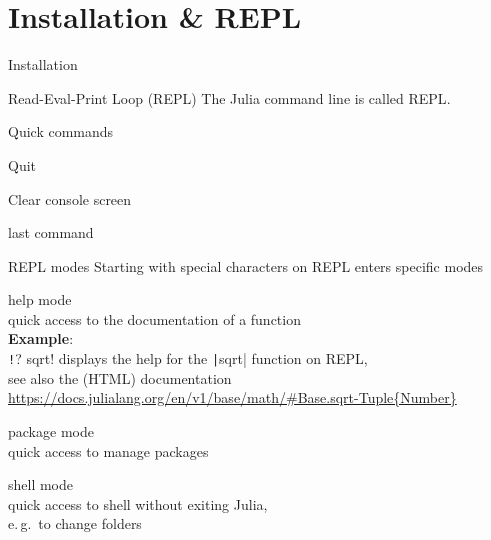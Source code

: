 \documentclass[aspectratio=169, handout]{beamer}
\begin{document}
    \section{Installation \& REPL}
    \begin{frame}{Installation}
    \end{frame}
    \begin{frame}{Read-Eval-Print Loop (REPL)}
        The Julia command line is called \alert{REPL}.

        Quick commands
        \begin{description}[leftmargin=1em]
            \item[\^\ D] Quit
            \item[\^\ L] Clear console screen
            \item[Up Arrow] last command
        \end{description}
    \end{frame}
    \begin{frame}{REPL modes}
        Starting with special characters on REPL enters specific modes
        \begin{description}[leftmargin=1em]
            \item[?] help mode\\
            quick access to the documentation of a function
            \\[.5\baselineskip]
            \textbf{Example}:\\
            \texttt!? sqrt! displays the help for the \texttt|sqrt| function on REPL,
            \\
            see also the (HTML) documentation\\
            {\footnotesize\url{https://docs.julialang.org/en/v1/base/math/\#Base.sqrt-Tuple{Number}}}
            \\
            \item[{]}] package mode
            \\ quick access to manage packages
            \item[;] shell mode
            \\ quick access to shell without exiting Julia,\\
            e.\,g.\ to change folders
        \end{description}
    \end{frame}
\end{document}

